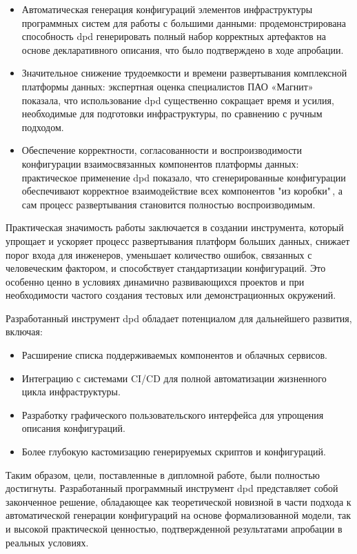 \begin{itemize}
    \item Автоматическая генерация конфигураций элементов инфраструктуры программных систем для работы с большими данными: продемонстрирована способность dpd генерировать полный набор корректных артефактов на основе декларативного описания, что было подтверждено в ходе апробации.
    \item Значительное снижение трудоемкости и времени развертывания комплексной платформы данных: экспертная оценка специалистов ПАО «Магнит» показала, что использование dpd существенно сокращает время и усилия, необходимые для подготовки инфраструктуры, по сравнению с ручным подходом.
    \item Обеспечение корректности, согласованности и воспроизводимости конфигурации взаимосвязанных компонентов платформы данных: практическое применение dpd показало, что сгенерированные конфигурации обеспечивают корректное взаимодействие всех компонентов "из коробки"\,, а сам процесс развертывания становится полностью воспроизводимым.
\end{itemize}
Практическая значимость работы заключается в создании инструмента, который упрощает и ускоряет процесс развертывания платформ больших данных, снижает порог входа для инженеров, уменьшает количество ошибок, связанных с человеческим фактором, и способствует стандартизации конфигураций. Это особенно ценно в условиях динамично развивающихся проектов и при необходимости частого создания тестовых или демонстрационных окружений.


Разработанный инструмент dpd обладает потенциалом для дальнейшего развития, включая:
\begin{itemize}
    \item Расширение списка поддерживаемых компонентов и облачных сервисов.
    \item Интеграцию с системами CI/CD для полной автоматизации жизненного цикла инфраструктуры.
    \item Разработку графического пользовательского интерфейса для упрощения описания конфигураций.
    \item Более глубокую кастомизацию генерируемых скриптов и конфигураций.
\end{itemize}

Таким образом, цели, поставленные в дипломной работе, были полностью достигнуты. Разработанный программный инструмент dpd представляет собой законченное решение, обладающее как теоретической новизной в части подхода к автоматической генерации конфигураций на основе формализованной модели, так и высокой практической ценностью, подтвержденной результатами апробации в реальных условиях.




